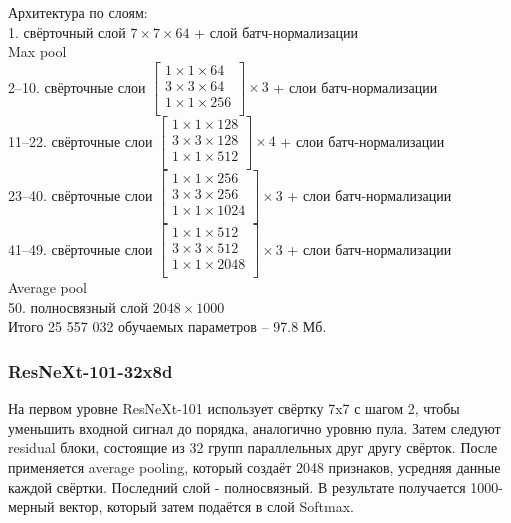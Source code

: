 Архитектура по слоям:\\
1. свёрточный слой $7\times7\times64$ + слой батч-нормализации\\
Max pool\\
2--10. свёрточные слои $\begin{bmatrix}
1\times1\times64\\
3\times3\times64\\
1\times1\times256\\
\end{bmatrix} \times3$ + слои батч-нормализации\\
11--22. свёрточные слои $\begin{bmatrix}
1\times1\times128\\
3\times3\times128\\
1\times1\times512\\
\end{bmatrix} \times4$ + слои батч-нормализации\\
23--40. свёрточные слои $\begin{bmatrix}
1\times1\times256\\
3\times3\times256\\
1\times1\times1024\\
\end{bmatrix} \times3$ + слои батч-нормализации\\
41--49. свёрточные слои $\begin{bmatrix}
1\times1\times512\\
3\times3\times512\\
1\times1\times2048\\
\end{bmatrix} \times3$ + слои батч-нормализации\\
Average pool\\
50. полносвязный слой $2048\times1000$\\

Итого 25 557 032 обучаемых параметров -- 97.8 Мб.
\subsubsection{ResNeXt-101-32x8d}
На первом уровне ResNeXt-101 использует свёртку 7x7 с шагом 2, чтобы уменьшить входной сигнал до порядка, аналогично уровню пула. Затем следуют residual блоки, состоящие из 32 групп параллельных друг другу свёрток. После применяется average pooling, который создаёт 2048 признаков, усредняя данные каждой свёртки. Последний слой - полносвязный. В результате получается 1000-мерный вектор, который затем подаётся в слой Softmax.
\\

